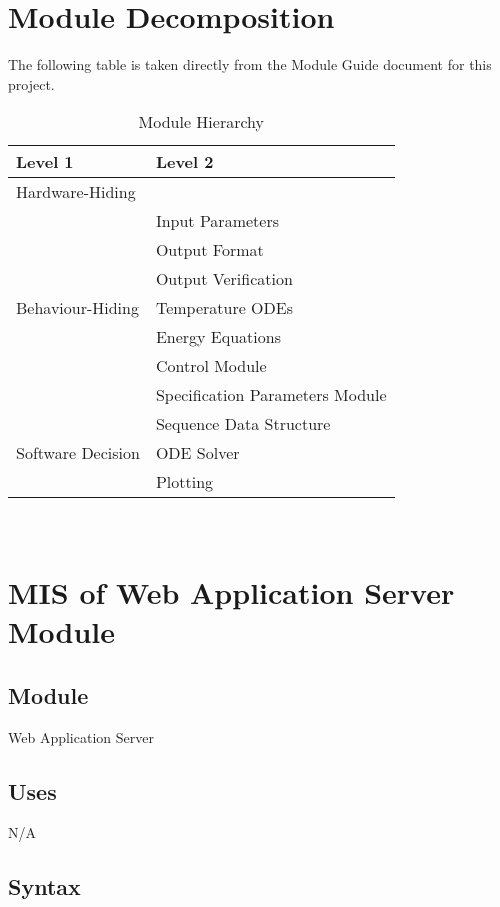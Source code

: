 \documentclass[12pt, titlepage]{article}
\begin{document}
\section{Module Decomposition}

The following table is taken directly from the Module Guide document for this project.

\begin{table}[h!]
\centering
\begin{tabular}{p{} p{}}
\toprule
\textbf{Level 1} & \textbf{Level 2}\\
\midrule

{Hardware-Hiding} & ~ \\
\midrule

\multirow{7}{0.3\textwidth}{Behaviour-Hiding} & Input Parameters\\
& Output Format\\
& Output Verification\\
& Temperature ODEs\\
& Energy Equations\\ 
& Control Module\\
& Specification Parameters Module\\
\midrule

\multirow{3}{0.3\textwidth}{Software Decision} & {Sequence Data Structure}\\
& ODE Solver\\
& Plotting\\
\bottomrule

\end{tabular}
\caption{Module Hierarchy}
\label{TblMH}
\end{table}

\newpage
~\newpage
\section{MIS of Web Application Server Module} 

\subsection{Module}
Web Application Server   
\subsection{Uses}
N/A
\subsection{Syntax}
\end{document}
